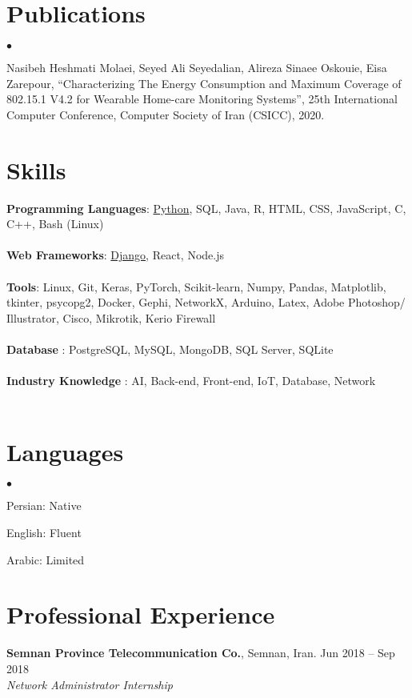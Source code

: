 \documentclass[margin,line]{res}
\newenvironment{list2}{
  \begin{list}{$\bullet$}{%
      \setlength{\itemsep}{0in}
      \setlength{\parsep}{0in} \setlength{\parskip}{0in}
      \setlength{\topsep}{0in} \setlength{\partopsep}{0in}
      \setlength{\leftmargin}{0.2in}}}{\end{list}}
\begin{document}
\begin{resume}
\section{\sc Publications}
\begin{list2}
	\item Nasibeh Heshmati Molaei, Seyed Ali Seyedalian, Alireza Sinaee Oskouie, Eisa Zarepour, “Characterizing
	The Energy Consumption and Maximum Coverage of 802.15.1 V4.2 for Wearable Home-care Monitoring
	Systems”, 25th International Computer Conference, Computer Society of Iran (CSICC), 2020.
\end{list2}

\section{\sc Skills}
{\bf Programming  Languages}:  
\underline{Python}, SQL, Java, R, HTML, CSS, JavaScript, C, C++, Bash (Linux)\\ \\ 
{\bf Web Frameworks}: 
\underline{Django}, React, Node.js\\ \\
{\bf Tools}: 
Linux, Git, Keras, PyTorch, Scikit-learn, Numpy, Pandas, Matplotlib, tkinter, psycopg2, Docker,  Gephi, NetworkX, Arduino,  Latex, Adobe Photoshop/ Illustrator, Cisco, Mikrotik, Kerio Firewall \\ \\
{\bf Database }: PostgreSQL, MySQL, MongoDB, SQL Server, SQLite \\ \\ 
{\bf Industry Knowledge} : AI, Back-end, Front-end, IoT, Database, Network \\ \\
\section{\sc Languages}
\begin{list2} 
	\item  Persian: Native 
	\item English: Fluent
	\item Arabic: Limited 
\end{list2}

\section{\sc Professional Experience}
{\bf Semnan Province Telecommunication Co.}, Semnan, Iran. \hfill{Jun 2018 -- Sep 2018}\\
{\em Network Administrator Internship }\\


\end{resume}
\end{document}
